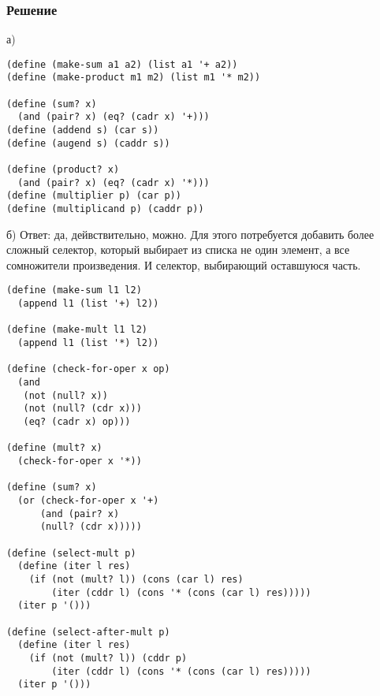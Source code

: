 \documentclass[10pt,a4paper]{article}
\begin{document}
\subsubsection*{Решение}
а)
\begin{lstlisting}
(define (make-sum a1 a2) (list a1 '+ a2))
(define (make-product m1 m2) (list m1 '* m2))

(define (sum? x)
  (and (pair? x) (eq? (cadr x) '+)))
(define (addend s) (car s))
(define (augend s) (caddr s))

(define (product? x)
  (and (pair? x) (eq? (cadr x) '*)))
(define (multiplier p) (car p))
(define (multiplicand p) (caddr p))

\end{lstlisting}
б) Ответ: да, дейвствительно, можно.
Для этого потребуется добавить более сложный селектор, который выбирает из списка не один элемент, а все сомножители произведения. И селектор, выбирающий оставшуюся часть.

\begin{lstlisting}
(define (make-sum l1 l2)
  (append l1 (list '+) l2))

(define (make-mult l1 l2)
  (append l1 (list '*) l2))

(define (check-for-oper x op)
  (and
   (not (null? x))
   (not (null? (cdr x)))
   (eq? (cadr x) op)))

(define (mult? x)
  (check-for-oper x '*))

(define (sum? x)
  (or (check-for-oper x '+)
      (and (pair? x)
      (null? (cdr x)))))

(define (select-mult p)
  (define (iter l res)
    (if (not (mult? l)) (cons (car l) res)
        (iter (cddr l) (cons '* (cons (car l) res)))))
  (iter p '()))

(define (select-after-mult p)
  (define (iter l res)
    (if (not (mult? l)) (cddr p)
        (iter (cddr l) (cons '* (cons (car l) res)))))
  (iter p '()))
\end{lstlisting}
\end{document}

